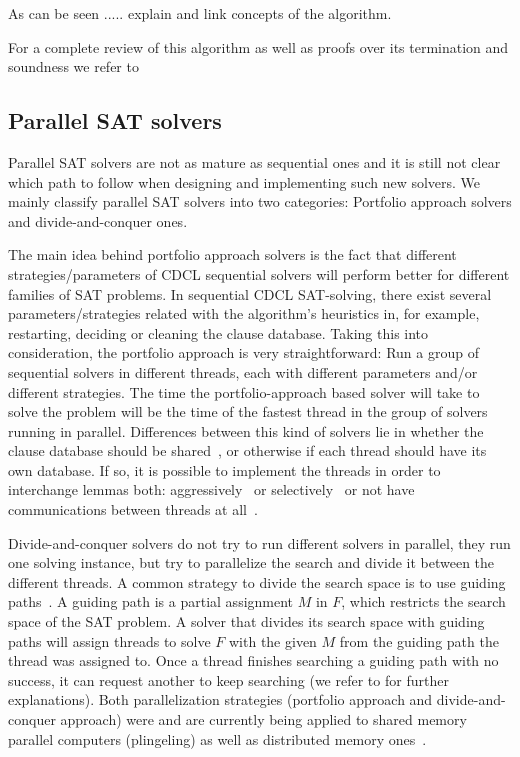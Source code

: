 \documentclass{llncs}
\begin{document}
As can be seen ..... explain and link concepts of the algorithm.

For a complete review of this algorithm as well as proofs over its
termination and soundness we refer to \cite{Nieuwenhuisetal2006JACM}


\subsection{Parallel SAT solvers}
Parallel SAT solvers are not as mature 
as sequential ones and it is still not clear which path to follow
when designing and implementing such new solvers.  
We mainly classify parallel SAT solvers into two categories: 
Portfolio approach solvers and divide-and-conquer ones.

The main idea behind portfolio approach solvers is the fact that different 
strategies/parameters of CDCL sequential solvers will perform better 
for different families of SAT problems. 
In sequential CDCL SAT-solving, there exist several parameters/strategies 
related with the algorithm's heuristics in, for example, restarting, deciding 
or cleaning the clause database. Taking this into 
consideration, the portfolio approach is very straightforward: 
Run a group of sequential solvers in different threads, 
each with different parameters
 and/or different strategies. The time the portfolio-approach based 
solver will take to solve the problem will be the time of the fastest 
thread in the group of solvers running in parallel. 
Differences between this kind of solvers lie in whether the clause
database should be shared~\cite{Sartagnan}, or otherwise if each thread should 
have its own database. If so, it is possible to implement the threads in order to
interchange lemmas both: aggressively~\cite{ManySAT} or selectively~\cite{plingeling} or 
not have communications between threads at all~\cite{ppfolio}.

Divide-and-conquer solvers do not try to run different solvers in parallel, 
they run one solving instance, but try to parallelize the search and divide it 
between the different threads. A common strategy to divide the search space is 
to use guiding paths~\cite{psato}. A guiding path is a partial assignment $M$ in $F$, 
which restricts the search space of the SAT problem. A solver that divides 
its search space with guiding paths will assign threads to solve $F$ with the 
given $M$ from the guiding path the thread was assigned to. Once a thread 
finishes searching a guiding path with no success, it can request another to 
keep searching (we refer to \cite{paMiraXT} for further explanations). 
Both parallelization strategies (portfolio approach and divide-and-conquer approach) 
were and are currently being applied 
to shared memory parallel computers (plingeling) as well as distributed 
memory ones~\cite{paMiraXT}. 
\end{document}
